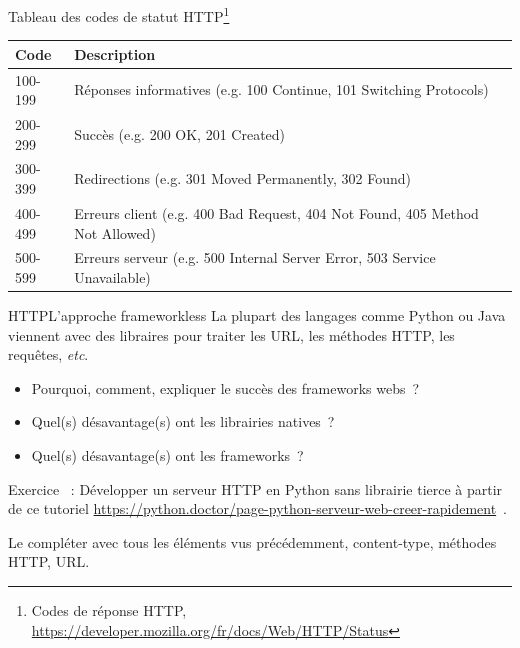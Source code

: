 \documentclass{beamer}
\begin{document}
    \begin{frame}{Tableau des codes de statut HTTP\footnote{Codes de réponse HTTP, \url{https://developer.mozilla.org/fr/docs/Web/HTTP/Status}}}
        \begin{tabular}{|p{1.5cm}|p{9.5cm}|}
            \hline
            \textbf{Code} & \textbf{Description}                                                         \\
            \hline
            100-199       & Réponses informatives (e.g. 100 Continue, 101 Switching Protocols)           \\
            \hline
            200-299       & Succès (e.g. 200 OK, 201 Created)                                            \\
            \hline
            300-399       & Redirections (e.g. 301 Moved Permanently, 302 Found)                         \\
            \hline
            400-499       & Erreurs client (e.g. 400 Bad Request, 404 Not Found, 405 Method Not Allowed) \\
            \hline
            500-599       & Erreurs serveur (e.g. 500 Internal Server Error, 503 Service Unavailable)    \\
            \hline
        \end{tabular}
    \end{frame}


    \begin{frame}{HTTP}{L'approche frameworkless}
        La plupart des langages comme Python ou Java viennent avec des libraires pour traiter les URL, les méthodes HTTP, les requêtes, \textit{etc}.
        \bigbreak
        \begin{itemize}
            \item Pourquoi, comment, expliquer le succès des frameworks webs~?
            \item  Quel(s) désavantage(s) ont les librairies natives~?
            \item  Quel(s) désavantage(s) ont les frameworks~?
        \end{itemize}
        \bigbreak
        Exercice \execcounterdispinc{}~: Développer un serveur HTTP en Python sans librairie tierce à partir de ce tutoriel \url{https://python.doctor/page-python-serveur-web-creer-rapidement}~.

        Le compléter avec tous les éléments vus précédemment, content-type, méthodes HTTP, URL.
    \end{frame}
\end{document}
